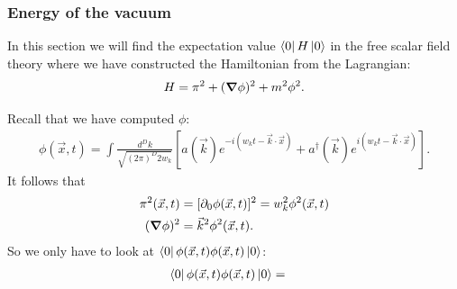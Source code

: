 \documentclass{book}
\theoremstyle{definition}
\newcommand{\p}{\partial}
\newcommand{\f}[2]{\frac{#1}{#2}}
\newcommand{\lb}{\left[}
\newcommand{\rb}{\right]}
\begin{document}
\subsubsection{Energy of the vacuum}


In this section we will find the expectation value $\bra{0}H\ket{0}$ in the free scalar field theory where we have constructed the Hamiltonian from the Lagrangian:
\begin{align}
H = \pi^2 + (\grad{\phi})^2 + m^2 \phi^2.
\end{align}

Recall that we have computed $\phi$:
\begin{align}
\phi(\vec{x},t) = \int \f{d^D k}{\sqrt{(2\pi)^D 2 w_k}} \lb a(\vec{k})e^{-i(w_k t - \vec{k}\cdot\vec{x})} + a^\dagger(\vec{k})e^{i(w_k t - \vec{k}\cdot \vec{x})} \rb.
\end{align}
It follows that
\begin{align}
\pi^2(\vec{x},t) &= [\p_0 \phi(\vec{x},t)]^2 = w_k^2 \phi^2(\vec{x},t)\nonumber\\
(\grad{\phi})^2 &= \vec{k}^2 \phi^2(\vec{x},t) \nonumber.
\end{align}
So we only have to look at $\bra{0}\phi(\vec{x},t)\phi(\vec{x},t)\ket{0}$:
\begin{align}
\bra{0}\phi(\vec{x},t)\phi(\vec{x},t)\ket{0} &=  
\end{align}
\end{document}
